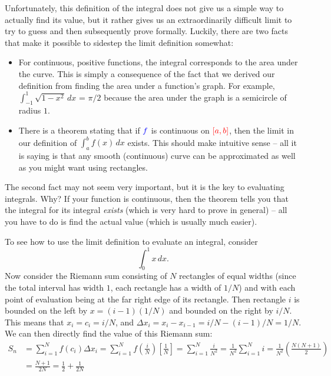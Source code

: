 \documentclass{myarticle}
\newcommand{\hor}[1]{\textcolor{red}{#1}} %
\newcommand{\ver}[1]{\textcolor{blue}{#1}}
\theoremstyle{nospace}
\newtheorem{old series theorem}{Theorem}
\newenvironment{series theorem}{\begin{mdframed}\begin{old series theorem}}{\end{old series theorem}\end{mdframed}}
\begin{document}
Unfortunately, this definition of the integral does not give us a simple way to actually find its value, but it rather gives us an extraordinarily difficult limit to try to guess and then subsequently prove formally. Luckily, there are two facts that make it possible to sidestep the limit definition somewhat:

\begin{itemize}
\item For continuous, positive functions, the integral corresponds to the area under the curve. This is simply a consequence of the fact that we derived our definition from finding the area under a function's graph. For example, $\int_{-1}^1 \sqrt{1 - x^2} \,dx$ = $\pi/2$ because the area under the graph is a semicircle of radius $1$.
\item There is a theorem stating that if $\ver{f}$ is continuous on $\hor{[a, b]}$, then the limit in our definition of $\int_a^b f(x) \,dx$ exists. This should make intuitive sense -- all it is saying is that any smooth (continuous) curve can be approximated as well as you might want using rectangles.
\end{itemize}

The second fact may not seem very important, but it is the key to evaluating integrals. Why? If your function is continuous, then the theorem tells you that the integral for its integral \emph{exists} (which is very hard to prove in general) -- all you have to do is find the actual value (which is usually much easier).

To see how to use the limit definition to evaluate an integral, consider \[ \int_0^1 x \,dx. \] Now consider the Riemann sum consisting of $N$ rectangles of equal widths (since the total interval has width $1$, each rectangle has a width of $1/N$) and with each point of evaluation being at the far right edge of its rectangle. Then rectangle $i$ is bounded on the left by $x = (i - 1)(1/N)$ and bounded on the right by $i/N$. This means that $x_i = c_i = i/N$, and $\Delta x_i = x_i - x_{i-1} = i/N - (i - 1)/N = 1/N$. We can then directly find the value of this Riemann sum: \begin{align*} S_n &= \sum_{i=1}^N f(c_i)\Delta x_i = \sum_{i=1}^N f\left(\frac{i}{N}\right)\left[\frac{1}{N}\right] = \sum_{i=1}^N \frac{i}{N^2} = \frac{1}{N^2}\sum_{i=1}^N i = \frac{1}{N^2}\left(\frac{N(N+1)}{2}\right) \\ &= \frac{N+1}{2N} = \frac{1}{2} + \frac{1}{2N} \end{align*}
\end{document}
